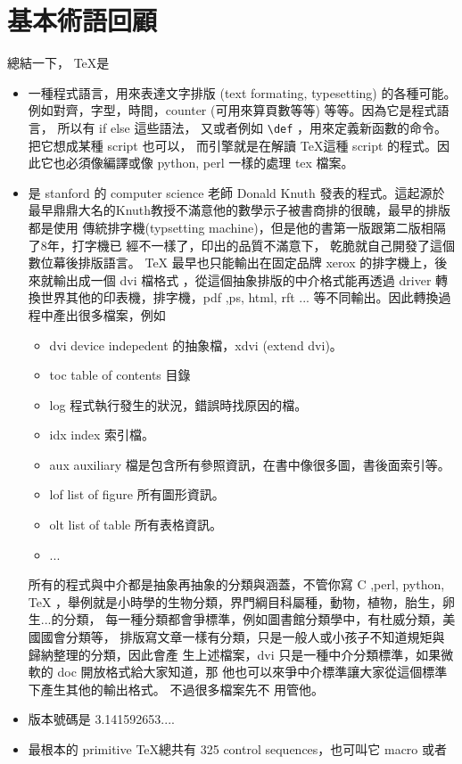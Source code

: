 \section{基本術語回顧}
總結一下， \TeX 是
\begin{itemize}
\item 一種程式語言，用來表達文字排版 (text formating, typesetting) 的各種可能。
例如對齊，字型，時間，counter (可用來算頁數等等) 等等。因為它是程式語言，
所以有 if else 這些語法，
又或者例如 \verb=\def= ，用來定義新函數的命令。 把它想成某種 script 也可以，
而引擎就是在解讀 \TeX 這種 script 的程式。因此它也必須像編譯或像 python, perl
一樣的處理 tex 檔案。
\item 是 stanford 的 computer science 老師 Donald Knuth 發表的程式。這起源於
  最早鼎鼎大名的Knuth教授不滿意他的數學示子被書商排的很醜，最早的排版都是使用
  傳統排字機(typsetting machine)，但是他的書第一版跟第二版相隔了8年，打字機已
  經不一樣了，印出的品質不滿意下， 乾脆就自己開發了這個數位幕後排版語言。
  TeX 最早也只能輸出在固定品牌 xerox 的排字機上，後來就輸出成一個 dvi 檔格式
  ，從這個抽象排版的中介格式能再透過 driver 轉換世界其他的印表機，排字機，pdf
  ,ps, html, rft ... 等不同輸出。因此轉換過程中產出很多檔案，例如
  \begin{itemize}
    \item dvi device indepedent 的抽象檔，xdvi (extend dvi)。
    \item toc table of contents 目錄
    \item log 程式執行發生的狀況，錯誤時找原因的檔。
    \item idx index 索引檔。
    \item aux auxiliary 檔是包含所有參照資訊，在書中像很多圖，書後面索引等。
    \item lof list of figure 所有圖形資訊。
    \item olt list of table 所有表格資訊。
    \item ...
  \end{itemize}
  所有的程式與中介都是抽象再抽象的分類與涵蓋，不管你寫 C ,perl, python, \TeX{}
  ，舉例就是小時學的生物分類，界門綱目科屬種，動物，植物，胎生，卵生...的分類，
  每一種分類都會爭標準，例如圖書館分類學中，有杜威分類，美國國會分類等，
  排版寫文章一樣有分類，只是一般人或小孩子不知道規矩與歸納整理的分類，因此會產
  生上述檔案，dvi 只是一種中介分類標準，如果微軟的 doc 開放格式給大家知道，那
  他也可以來爭中介標準讓大家從這個標準下產生其他的輸出格式。 不過很多檔案先不
  用管他。
\item 版本號碼是 3.141592653....
\item 最根本的 primitive \TeX 總共有 325 control sequences，也可叫它 macro 或者

\end{itemize}
